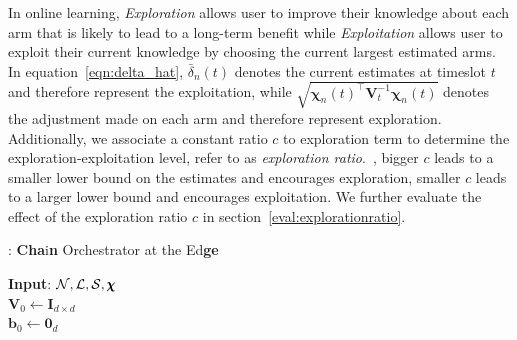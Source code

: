 In online learning, \textit{Exploration} allows user to improve their knowledge about each arm that is likely to lead to a long-term benefit while \textit{Exploitation} allows user to exploit their current knowledge by choosing the current largest estimated arms. In equation~\ref{eqn:delta_hat}, $\bar{\delta}_{n}(t)$ denotes the current estimates at timeslot $t$ and therefore represent the exploitation, while $\sqrt{\pmb{\chi}_{n}(t)^{\intercal}\pmb{V}_{t}^{-1}\pmb{\chi}_{n}(t)}$ denotes the adjustment made on each arm and therefore represent exploration. Additionally, we associate
a constant ratio $c$ to exploration term to determine the exploration-exploitation level, refer to as \textit{exploration ratio}.\ \eg, bigger $c$ leads to a smaller lower bound on the estimates and encourages exploration, smaller $c$ leads to a larger lower bound and encourages exploitation. We further evaluate the effect of the exploration ratio $c$ in section~\ref{eval:explorationratio}.
\begin{algorithm}[t]
	\DontPrintSemicolon
	\caption{\textbf{\myalgorithm}: \textbf{Cha}i\textbf{n} Orchestrator at the Ed\textbf{ge}}
	\label{alg:cccpa}
	\textbf{Input}: $\mathcal{N}, \mathcal{L}, \mathcal{S},\pmb{\chi} $\\
	$\pmb{V}_{0} \gets \pmb{I}_{d\times d}$ \label{alg_bandedge_line_V0} \\
	$\pmb{b}_{0} \gets \pmb{0}_{d}$ \label{alg_bandedge_line_b0} \\
\end{algorithm}

